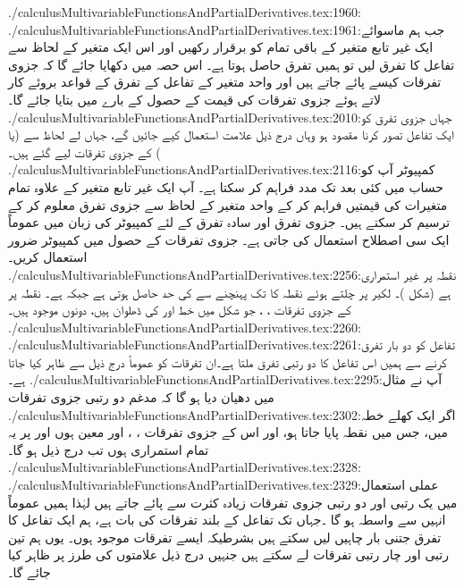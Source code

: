 ./calculusMultivariableFunctionsAndPartialDerivatives.tex:1960:
./calculusMultivariableFunctionsAndPartialDerivatives.tex:1961:جب ہم   ماسوائے ایک غیر تابع متغیر  کے باقی تمام  کو برقرار رکھیں اور اس ایک متغیر کے لحاظ سے تفاعل کا تفرق لیں تو ہمیں  تفرق حاصل ہوتا ہے۔ اس حصہ میں دکھایا جائے گا کہ جزوی تفرقات کیسے  پائے جاتے ہیں اور واحد متغیر کے تفاعل کے تفرق کے قواعد بروئے کار لاتے ہوئے   جزوی تفرقات   کی قیمت کے حصول کے بارے میں بتایا جائے گا۔
./calculusMultivariableFunctionsAndPartialDerivatives.tex:2010:جہاں جزوی تفرق  کو ایک تفاعل تصور کرنا مقصود  ہو وہاں درج ذیل علامت استعمال کیے جائیں گے، جہاں   لے لحاظ سے  (یا ) کے جزوی تفرقات لیے گئے ہیں۔
./calculusMultivariableFunctionsAndPartialDerivatives.tex:2116:\quad کمپیوٹر آپ کو حساب میں کئی بعد  تک مدد فراہم کر سکتا ہے۔ آپ ایک غیر تابع متغیر کے علاوہ تمام متغیرات کی قیمتیں فراہم کر کے واحد  متغیر کے لحاظ سے جزوی تفرق معلوم کر  کے  ترسیم کر سکتے ہیں۔ جزوی تفرق اور سادہ تفرق کے لئے کمپیوٹر کی زبان میں عموماً  ایک  سی  اصطلاح استعمال کی جاتی ہے۔  جزوی تفرقات کے حصول میں کمپیوٹر ضرور استعمال کریں۔
./calculusMultivariableFunctionsAndPartialDerivatives.tex:2256:نقطہ  پر غیر استمراری ہے (شکل )۔ لکیر  پر چلتے ہوئے  نقطہ   کا   تک پہنچنے سے  کی حد  حاصل ہوتی  ہے جبکہ  ہے۔   نقطہ  پر  کے جزوی تفرقات ، ، جو شکل میں خط  اور  کی ڈھلوان ہیں،  دونوں موجود ہیں۔
./calculusMultivariableFunctionsAndPartialDerivatives.tex:2260:
./calculusMultivariableFunctionsAndPartialDerivatives.tex:2261:تفاعل  کو دو بار تفرق کرنے سے ہمیں  اس تفاعل کا دو رتبی تفرق ملتا ہے۔ان تفرقات کو عموماً درج ذیل سے ظاہر کیا جاتا ہے۔
./calculusMultivariableFunctionsAndPartialDerivatives.tex:2295:آپ نے مثال  میں دھیان دیا ہو گا کہ    مدغم      دو رتبی جزوی تفرقات
./calculusMultivariableFunctionsAndPartialDerivatives.tex:2302:اگر   ایک  کھلے  خطہ میں،  جس میں نقطہ  پایا جاتا ہو،  اور اس کے جزوی تفرقات ، ،  اور  معین ہوں اور      پر یہ تمام  استمراری ہوں تب درج ذیل ہو گا۔
./calculusMultivariableFunctionsAndPartialDerivatives.tex:2328:
./calculusMultivariableFunctionsAndPartialDerivatives.tex:2329:عملی استعمال میں یک رتبی اور دو رتبی جزوی تفرقات   زیادہ کثرت سے پائے جاتے ہیں لہٰذا ہمیں عموماً انہیں سے واسطہ ہو گا ۔جہاں تک تفاعل کے بلند تفرقات  کی بات ہے، ہم ایک تفاعل کا تفرق  جتنی بار چاہیں لیں سکتے ہیں بشرطیکہ ایسے تفرقات موجود ہوں۔ یوں ہم تین رتبی اور چار رتبی تفرقات لے سکتے ہیں جنہیں درج ذیل علامتوں  کی طرز    پر  ظاہر کیا جائے گا۔
